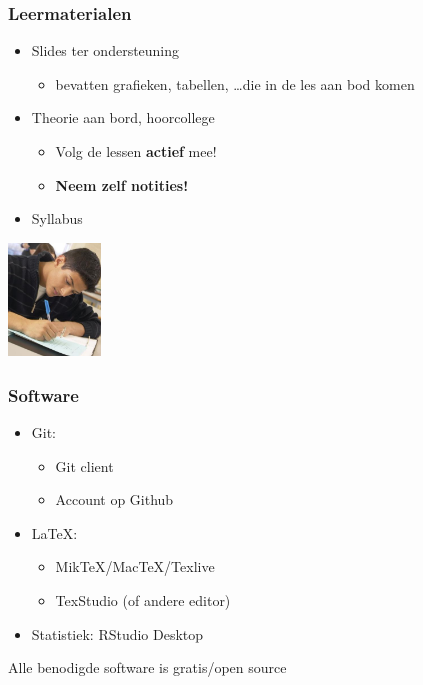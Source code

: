 \documentclass{beamer}
\begin{document}
\begin{frame}
  \frametitle{Leermaterialen}

  \begin{itemize}
    \item Slides ter ondersteuning
      \begin{itemize}
        \item bevatten grafieken, tabellen, \ldots die in de les aan bod komen
      \end{itemize}
    \item Theorie aan bord, hoorcollege
      \begin{itemize}
        \item Volg de lessen \textbf{actief} mee!
        \item \textbf{Neem zelf notities!}
      \end{itemize}
    \item Syllabus
  \end{itemize}


  \begin{center}
    \includegraphics[height=3cm]{img/intro-06.jpg}
  \end{center}

\end{frame}

\begin{frame}
    \frametitle{Software}
    
    \begin{itemize}
        \item Git:
        \begin{itemize}
            \item Git client
            \item Account op Github
        \end{itemize}
        \item {\LaTeX}:
        \begin{itemize}
            \item MikTeX/MacTeX/Texlive
            \item TexStudio (of andere editor)
        \end{itemize}
        \item Statistiek: RStudio Desktop
    \end{itemize}

    \centering
    Alle benodigde software is gratis/open source
\end{frame}
\end{document}
